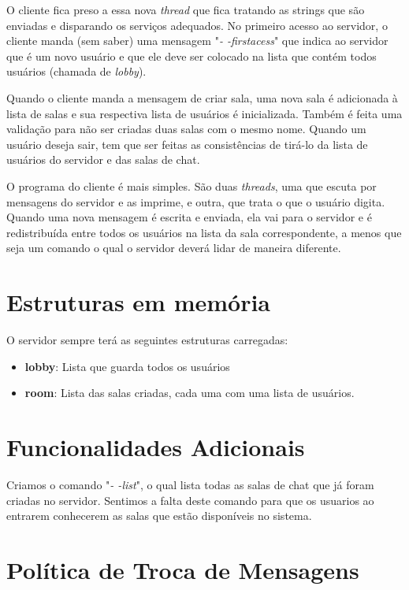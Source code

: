 \documentclass[a4paper, 11pt]{article} %
\begin{document}
O cliente fica preso a essa nova \textit{thread} que fica tratando as strings que são enviadas e disparando os serviços adequados. No primeiro acesso ao servidor, o cliente manda (sem saber) uma mensagem "\textit{- -firstacess}" que indica ao servidor que é um novo usuário e que ele deve ser colocado na lista que contém todos usuários (chamada de \textit{lobby}).

Quando o cliente manda a mensagem de criar sala, uma nova sala é adicionada à lista de salas e sua respectiva lista de usuários é inicializada. Também é feita uma validação para não ser criadas duas salas com o mesmo nome. Quando um usuário deseja sair, tem que ser feitas as consistências de tirá-lo da lista de usuários do servidor e das salas de chat.

O programa do cliente é mais simples. São duas \textit{threads}, uma que escuta por mensagens do servidor e as imprime, e outra, que trata o que o usuário digita. Quando uma nova mensagem é escrita e enviada, ela vai para o servidor e é redistribuída entre todos os usuários na lista da sala correspondente, a menos que seja um comando o qual o servidor deverá lidar de maneira diferente.


\section*{Estruturas em memória}

O servidor sempre terá as seguintes estruturas carregadas:

\begin{itemize}
\item \textbf{lobby}: Lista que guarda todos os usuários
\item \textbf{room}: Lista das salas criadas, cada uma com uma lista de usuários.
\end{itemize}

\section*{Funcionalidades Adicionais}

Criamos o comando "\textit{- -list}", o qual lista todas as salas de chat que já foram criadas no servidor. Sentimos a falta deste comando para que os usuarios ao entrarem conhecerem as salas que estão disponíveis no sistema.


\section*{Política de Troca de Mensagens}
\end{document}
